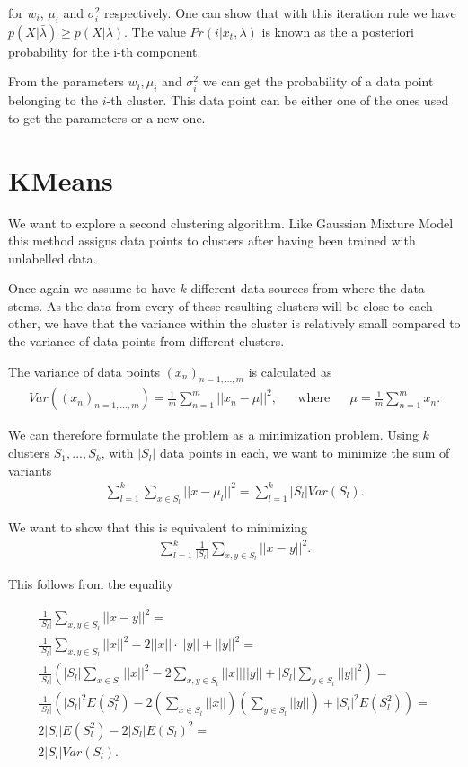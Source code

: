 for $w_i$, $\mu_i$ and $\sigma_i^2$ respectively. One can show that with this iteration rule we have $p(X|\bar{\lambda}) \geq p(X|\lambda)$. The value $Pr(i|x_t, \lambda)$ is known as the a posteriori probability for the i-th component.

From the parameters $w_i, \mu_i$ and $\sigma_i^2$ we can get the probability of a data point belonging to the $i$-th cluster. This data point can be either one of the ones used to get the parameters or a new one.

\section{KMeans}

We want to explore a second clustering algorithm. Like Gaussian Mixture Model this method assigns data points to clusters after having been trained with unlabelled data.

Once again we assume to have $k$ different data sources from where the data stems. As the data from every of these resulting clusters will be close to each other, we have that the variance within the cluster is relatively small compared to the variance of data points from different clusters.

The variance of data points $(x_n)_{n=1, ..., m}$ is calculated as
\begin{align*}
	Var((x_n)_{n=1, ..., m}) = \frac{1}{m} \sum_{n=1}^{m} ||x_n - \mu||^2, && \text{where} && \mu = \frac{1}{m} \sum_{n=1}^{m} x_n.
\end{align*}

We can therefore formulate the problem as a minimization problem. Using $k$ clusters $S_1, ..., S_k$, with $|S_l|$ data points in each, we want to minimize the sum of variants
\begin{align*}
	\sum_{l=1}^{k} \sum_{x \in S_l} ||x - \mu_l||^2 = \sum_{l=1}^{k} |S_l| Var(S_l).
\end{align*}

We want to show that this is equivalent to minimizing
\begin{align*}
	\sum_{l=1}^{k} \frac{1}{|S_l|} \sum_{x, y \in S_l} ||x-y||^2.
\end{align*}

This follows from the equality

\begin{align*}
	\frac{1}{|S_l|} \sum_{x, y \in S_l} ||x-y||^2 =\\
	\frac{1}{|S_l|} \sum_{x, y \in S_l} ||x||^2 - 2||x||\cdot||y|| + ||y||^2 =\\
	\frac{1}{|S_l|} (|S_l| \sum_{x\in S_l} ||x||^2 - 2\sum_{x, y \in S_l}||x|| ||y|| + |S_l| \sum_{y \in S_l}||y||^2) =\\
	\frac{1}{|S_l|} (|S_l|^2 E(S_l^2) - 2(\sum_{x\in S_l}||x||)(\sum_{y \in S_l}||y||) + |S_l|^2 E(S_l^2)) =\\
	2|S_l| E(S_l^2) - 2|S_l| E(S_l)^2 =\\
	2 |S_l| Var(S_l).
\end{align*}

